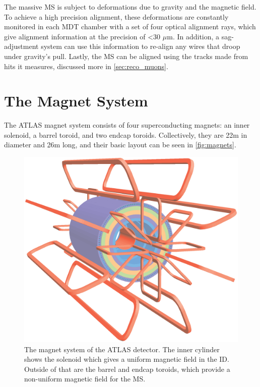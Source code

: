 The massive \ac{MS} is subject to deformations due to gravity and the magnetic field. To achieve a high precision alignment, these deformations are constantly monitored in each \ac{MDT} chamber with a set of four optical alignment rays, which give alignment information at the precision of <30 $\mu$m. In addition, a sag-adjustment system can use this information to re-align any wires that droop under gravity's pull. Lastly, the \ac{MS} can be aligned using the tracks made from hits it measures, discussed more in \autoref{sec:reco_muons}.

\section{The Magnet System}
\label{sec:magnets}

The ATLAS magnet system consists of four superconducting magnets: an inner solenoid, a barrel toroid, and two endcap toroids. Collectively, they are 22m in diameter and 26m long, and their basic layout can be seen in \autoref{fig:magnets}.

\begin{centering}
\begin{figure}[bth]
\myfloatalign
\includegraphics[width=.90\linewidth]{figures/atlas/ATLcoilGeom.eps}
\caption{The magnet system of the ATLAS detector. The inner cylinder shows the solenoid which gives a uniform magnetic field in the \ac{ID}. Outside of that are the barrel and endcap toroids, which provide a non-uniform magnetic field for the \ac{MS}.}
\label{fig:magnets}
\end{figure}
\end{centering}

